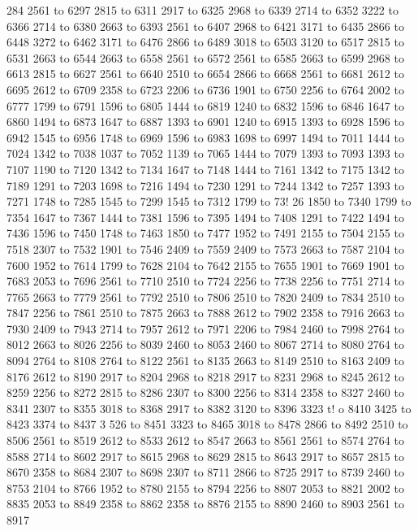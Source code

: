 284 2561 to 6297 2815 to 6311 2917 to 6325 2968 to 6339 2714 to 6352 3222 to 6366 2714 to 6380 2663 to 6393 2561 to 6407 2968 to 6421 3171 to 6435 2866 to 6448 3272 to 6462 3171 to 6476 2866 to 6489 3018 to 6503 3120 to 6517 2815 to 6531 2663 to 6544 2663 to 6558 2561 to 6572 2561 to 6585 2663 to 6599 2968 to 6613 2815 to 6627 2561 to 6640 2510 to 6654 2866 to 6668 2561 to 6681 2612 to 6695 2612 to 6709 2358 to 6723 2206 to 6736 1901 to 6750 2256 to 6764 2002 to 6777 1799 to 6791 1596 to 6805 1444 to 6819 1240 to 6832 1596 to 6846 1647 to 6860 1494 to 6873 1647 to 6887 1393 to 6901 1240 to 6915 1393 to 6928 1596 to 6942 1545 to 6956 1748 to 6969 1596 to 6983 1698 to 6997 1494 to 7011 1444 to 7024 1342 to 7038 1037 to 7052 1139 to 7065 1444 to 7079 1393 to 7093 1393 to 7107 1190 to 7120 1342 to 7134 1647 to 7148 1444 to 7161 1342 to 7175 1342 to 7189 1291 to 7203 1698 to 7216 1494 to 7230 1291 to 7244 1342 to 7257 1393 to 7271 1748 to 7285 1545 to 7299 1545 to 7312 1799 to 73!
26 1850 to 7340 1799 to 7354 1647 
to 7367 1444 to 7381 1596 to 7395 1494 to 7408 1291 to 7422 1494 to 7436 1596 to 7450 1748 to 7463 1850 to 7477 1952 to 7491 2155 to 7504 2155 to 7518 2307 to 7532 1901 to 7546 2409 to 7559 2409 to 7573 2663 to 7587 2104 to 7600 1952 to 7614 1799 to 7628 2104 to 7642 2155 to 7655 1901 to 7669 1901 to 7683 2053 to 7696 2561 to 7710 2510 to 7724 2256 to 7738 2256 to 7751 2714 to 7765 2663 to 7779 2561 to 7792 2510 to 7806 2510 to 7820 2409 to 7834 2510 to 7847 2256 to 7861 2510 to 7875 2663 to 7888 2612 to 7902 2358 to 7916 2663 to 7930 2409 to 7943 2714 to 7957 2612 to 7971 2206 to 7984 2460 to 7998 2764 to 8012 2663 to 8026 2256 to 8039 2460 to 8053 2460 to 8067 2714 to 8080 2764 to 8094 2764 to 8108 2764 to 8122 2561 to 8135 2663 to 8149 2510 to 8163 2409 to 8176 2612 to 8190 2917 to 8204 2968 to 8218 2917 to 8231 2968 to 8245 2612 to 8259 2256 to 8272 2815 to 8286 2307 to 8300 2256 to 8314 2358 to 8327 2460 to 8341 2307 to 8355 3018 to 8368 2917 to 8382 3120 to 8396 3323 t!
o 8410 3425 to 8423 3374 to 8437 3
526 to 8451 3323 to 8465 3018 to 8478 2866 to 8492 2510 to 8506 2561 to 8519 2612 to 8533 2612 to 8547 2663 to 8561 2561 to 8574 2764 to 8588 2714 to 8602 2917 to 8615 2968 to 8629 2815 to 8643 2917 to 8657 2815 to 8670 2358 to 8684 2307 to 8698 2307 to 8711 2866 to 8725 2917 to 8739 2460 to 8753 2104 to 8766 1952 to 8780 2155 to 8794 2256 to 8807 2053 to 8821 2002 to 8835 2053 to 8849 2358 to 8862 2358 to 8876 2155 to 8890 2460 to 8903 2561 to 8917
